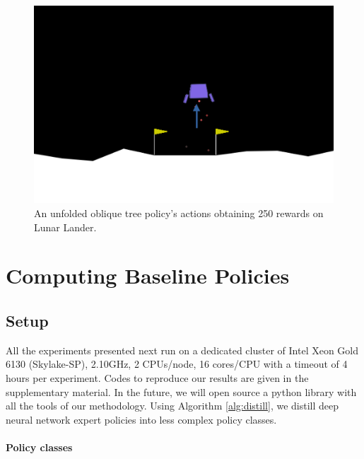 \begin{figure}
\begin{minipage}{0.43\textwidth}
    \includegraphics[trim={0 00cm 0 0},clip,scale=0.24]{images/images_part3/ll_g.png}
\end{minipage}
\caption{An unfolded oblique tree policy's actions obtaining 250 rewards on Lunar Lander.}\label{lst:policy_ll}
\end{figure}

\section{Computing Baseline Policies}

\subsection{Setup}
All the experiments presented next run on a dedicated cluster of Intel Xeon Gold 6130 (Skylake-SP), 2.10GHz, 2 CPUs/node, 16 cores/CPU with a timeout of 4 hours per experiment. Codes to reproduce our results are given in the supplementary material. In the future, we will open source a python library with all the tools of our methodology.
Using Algorithm \ref{alg:distill}, we distill deep neural network expert policies into less complex policy classes.

\paragraph{Policy classes}

